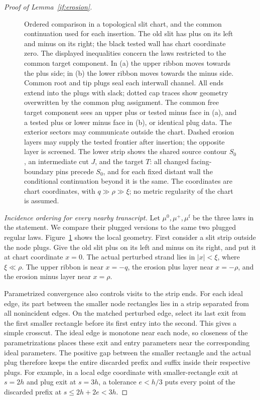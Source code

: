 \documentclass[11pt]{article}
\theoremstyle{definition}
\theoremstyle{remark}
\numberwithin{equation}{section}
\begin{document}
\begin{proof}[Proof of Lemma~\ref{if:erosion}]
\begin{figure}[!htbp]
\caption{Ordered comparison in a topological slit chart, and the common
continuation used for each insertion. The old slit has plus on its left
and minus on its right; the black tested wall has chart coordinate zero.
The displayed inequalities concern the laws restricted to the common
target component. In (a) the upper ribbon moves towards the plus
side; in (b) the lower ribbon moves towards the minus side. Common root
and tip plugs seal each interwall channel. All ends extend into the
plugs with slack; dotted cap traces show geometry overwritten by the
common plug assignment. The common free target component sees an upper
plus or tested minus face in (a), and a tested plus or lower minus face
in (b), or identical plug data. The exterior sectors may communicate
outside the chart. Dashed erosion layers may supply the tested frontier
after insertion; the opposite layer is screened. The lower strip shows
the shared source contour $S_0$, an intermediate cut $J$, and the target
$T$: all changed facing-boundary pins precede $S_0$, and for each fixed
distant wall the conditional continuation beyond it is the same. The
coordinates are chart coordinates, with $q\gg\rho\gg\xi$; no metric
regularity of the chart is assumed.}
\label{if:slit-figure}
\end{figure}

\emph{Incidence ordering for every nearby transcript.}
Let $\mu^0,\mu^+,\mu^{\mathrm f}$ be the three laws in the statement.
We compare their plugged versions to the same two plugged regular
laws. Figure~\ref{if:slit-figure} shows the local geometry. First
consider a slit strip outside the node plugs. Give the old slit plus
on its left and minus on its right, and put it at chart coordinate
$x=0$. The actual perturbed strand lies in $|x|<\xi$, where
$\xi\ll\rho$. The upper ribbon is near $x=-q$, the erosion plus
layer near $x=-\rho$, and the erosion minus layer near $x=\rho$.

Parametrized convergence also controls visits to the strip ends.
For each ideal edge, its part between the smaller node rectangles
lies in a strip separated from all nonincident edges. On the matched
perturbed edge, select its last exit from the first smaller rectangle
before its first entry into the second. This gives a simple crosscut.
The ideal edge is monotone near each node, so closeness of the
parametrizations places these exit and entry parameters near the
corresponding ideal parameters. The positive gap between the smaller
rectangle and the actual plug therefore keeps the entire discarded
prefix and suffix inside their respective plugs. For example, in a
local edge coordinate with smaller-rectangle exit at $s=2h$ and plug
exit at $s=3h$, a tolerance $e<h/3$ puts every point of the discarded
prefix at $s\le2h+2e<3h$.


\end{proof}
\end{document}
